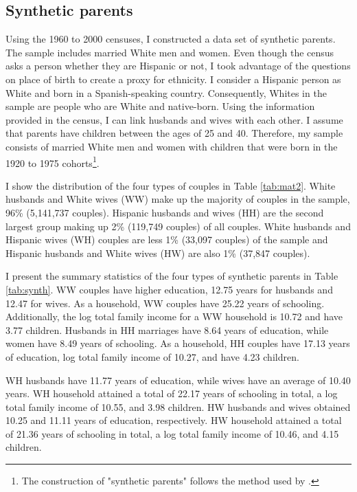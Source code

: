 \documentclass[a4paper,fleqn]{cas-sc}
\begin{document}


\subsection{Synthetic parents}

Using the 1960 to 2000 censuses, I constructed a data set of synthetic parents. The sample includes married White men and women. Even though the census asks a person whether they are Hispanic or not, I took advantage of the questions on place of birth to create a proxy for ethnicity. I consider a Hispanic person as White and born in a Spanish-speaking country. Consequently, Whites in the sample are people who are White and native-born. Using the information provided in the census, I can link husbands and wives with each other. I assume that parents have children between the ages of 25 and 40. Therefore, my sample consists of married White men and women with children that were born in the 1920 to 1975 cohorts\footnote{The construction of "synthetic parents" follows the method used by \citet{rubinstein2014pride}.}.



I show the distribution of the four types of couples in Table \ref{tab:mat2}. White husbands and White wives (WW) make up the majority of couples in the sample, 96\% (5,141,737 couples). Hispanic husbands and wives (HH) are the second largest group making up 2\% (119,749 couples) of all couples. White husbands and Hispanic wives (WH) couples are less 1\% (33,097 couples) of the sample and Hispanic husbands and White wives (HW) are also 1\% (37,847 couples).


I present the summary statistics of the four types of synthetic parents in Table \ref{tab:synth}. WW couples have higher education, 12.75 years for husbands and 12.47 for wives. As a household, WW couples have 25.22 years of schooling. Additionally, the log total family income for a WW household is 10.72 and have 3.77 children. Husbands in HH marriages have 8.64 years of education, while women have 8.49 years of schooling. As a household, HH couples have 17.13 years of education, log total family income of 10.27, and have 4.23 children.

WH husbands have 11.77 years of education, while wives have an average of 10.40 years. WH household attained a total of 22.17 years of schooling in total, a log total family income of 10.55, and 3.98 children. HW husbands and wives obtained 10.25 and 11.11 years of education, respectively. HW household attained a total of 21.36 years of schooling in total, a log total family income of 10.46, and 4.15 children.
\end{document}
